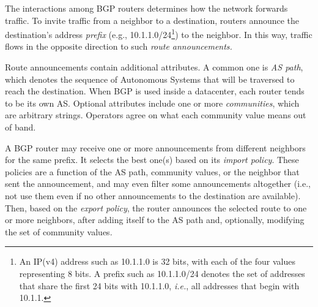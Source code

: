 \documentclass{sig-alternate-10pt}
\newcommand{\IE}{\emph{i.e.}}
\newcommand{\ETC}{\emph{etc.}}
\begin{document}
The interactions among BGP routers determines how the network forwards traffic. To invite traffic from a neighbor to a destination, routers announce the destination's address {\em prefix} (e.g., 10.1.1.0/24\footnote{An IP(v4) address
such as 10.1.1.0 is 32 bits, with each of the four values representing 8 bits. A prefix such as 10.1.1.0/24 denotes the set of addresses that share the first 24 bits with 10.1.1.0, \IE, all addresses that begin with 10.1.1.}) to the neighbor. In this way, traffic flows in the opposite direction to such {\em route announcements.}

Route announcements contain additional attributes. A common one is {\em AS path}, which denotes the sequence of Autonomous Systems that will be traversed to reach the destination. When BGP is used inside a datacenter, each router tends to be its own AS. Optional attributes include one or more {\em communities}, which are arbitrary strings. Operators agree on what each community value means out of band.

A BGP router may receive one or more announcements from different neighbors for the same prefix. It selects the best one(s) based on its {\em import policy}. These policies are a function of the AS path, community values, or the neighbor that sent the announcement, and may even filter some announcements altogether (i.e., not use them even if no other announcements to the destination are available). Then, based on the {\em export policy}, the router announces the selected route to one or more neighbors, after adding itself to the AS path and, optionally, modifying the set of community values.

\end{document}
